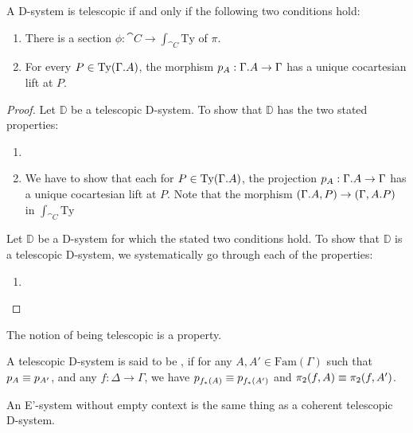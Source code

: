 \begin{lem}
A D-system is telescopic if and only if  the following two conditions hold:
\begin{enumerate}
\item There is a section $\phi:\cat{C}\to \int_{\cat{C}}\mathrm{Ty}$ of $\pi$.
\item For every $P\in\mathrm{Ty}(\ctxext{\Gamma}{A})$,
the morphism $p_A:\ctxext{\Gamma}{A}\to\Gamma$ has a unique cocartesian lift
at $P$.
\end{enumerate}
\end{lem}

\begin{proof}
Let $\mathbb{D}$ be a telescopic D-system. To show that $\mathbb{D}$ has the two
stated properties:
\begin{enumerate}
\item
\item We have to show that each for $P\in\mathrm{Ty}(\ctxext{\Gamma}{A})$,
the projection $p_A:\ctxext{\Gamma}{A}\to\Gamma$ has a unique cocartesian lift
at $P$. Note that the morphism $(\ctxext{\Gamma}{A},P)\to (\Gamma,\ctxext{A}{P})$
in $\int_{\cat{C}}\mathrm{Ty}$ 
\end{enumerate}

Let $\mathbb{D}$ be a D-system for which the stated two conditions hold. To show
that $\mathbb{D}$ is a telescopic D-system, we systematically go through each of the
properties:
\begin{enumerate}
\item 
\end{enumerate} 
\end{proof}

\begin{conj}
The notion of being telescopic is a property.
\end{conj}

\begin{defn}
A telescopic D-system is said to be , if for any $A,A'\in\mathrm{Fam}(\Gamma)$
such that $p_A\equiv p_{A'}$, and any $f:\Delta\to\Gamma$, we have
$p_{f_\ast(A)}\equiv p_{f_\ast(A')}$ and $\pi_2(f,A)\equiv \pi_2(f,A')$.
\end{defn}

\begin{thm}
An E'-system without empty context is the same thing as a coherent telescopic D-system.
\end{thm}


